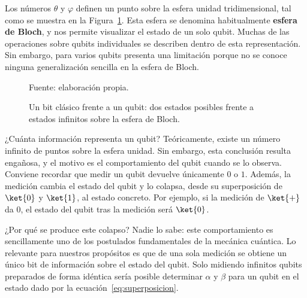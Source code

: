 Los números $\theta$ y $\varphi$ definen un punto sobre la esfera unidad tridimensional,
tal como se muestra en la Figura~\ref{fig:bloch}. Esta esfera se denomina habitualmente
\textbf{esfera de Bloch}, y nos permite visualizar el estado de un solo
qubit. Muchas de las operaciones sobre qubits individuales se describen 
dentro de esta representación. Sin embargo, para varios qubits presenta una limitación
porque no se conoce ninguna generalización sencilla en la
esfera de Bloch.

%
%
%
\begin{figure}[htbp]
    \centering
    

    \caption{Un bit clásico frente a un qubit: dos estados posibles frente
             a estados infinitos sobre la esfera de Bloch.}
    \label{fig:bloch}

    {\footnotesize Fuente: elaboración propia.}
\end{figure}

¿Cuánta información representa un qubit? Teóricamente, existe un número infinito de
puntos sobre la esfera unidad. Sin embargo, esta
conclusión resulta engañosa, y el motivo es el comportamiento del qubit cuando se lo observa.
Conviene recordar que medir un qubit devuelve únicamente $0$ o $1$. Además, la medición cambia el
estado del qubit y lo colapsa, desde su superposición de $\ket{0}$ y $\ket{1}$, al estado
concreto. Por ejemplo, si la medición de
$\ket{+}$ da $0$, el estado del qubit tras la medición será $\ket{0}$.

¿Por qué se produce este colapso? Nadie lo sabe: este comportamiento es sencillamente uno de
los postulados fundamentales de la mecánica cuántica. Lo relevante para nuestros propósitos es
que de una sola medición se obtiene un único bit de información sobre el estado del qubit.
Solo midiendo infinitos qubits preparados de forma idéntica
sería posible determinar $\alpha$ y $\beta$ para un qubit en el estado dado por la
ecuación~\eqref{eq:superposicion}.

